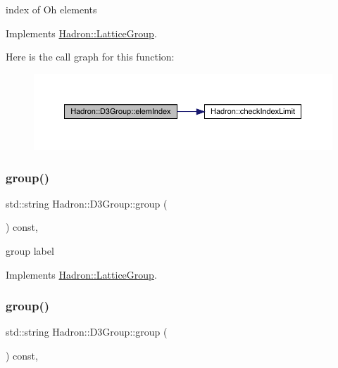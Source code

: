 index of Oh elements 

Implements \mbox{\hyperlink{structHadron_1_1LatticeGroup_afb8e3ee60de059f75bce1044c694e1e8}{Hadron\+::\+Lattice\+Group}}.

Here is the call graph for this function\+:
\nopagebreak
\begin{figure}[H]
\begin{center}
\leavevmode
\includegraphics[width=350pt]{de/de1/structHadron_1_1D3Group_a90ac88df35dd8e919637917dc22ee903_cgraph}
\end{center}
\end{figure}
\mbox{\label{structHadron_1_1D3Group_a60e24b1e2d17481b7ab94860c95ce155}} 
\subsubsection{\texorpdfstring{group()}{group()}\hspace{0.1cm}{\footnotesize\ttfamily [1/2]}}
{\footnotesize\ttfamily std\+::string Hadron\+::\+D3\+Group\+::group (\begin{DoxyParamCaption}{ }\end{DoxyParamCaption}) const\hspace{0.3cm}{\ttfamily [inline]}, {\ttfamily [virtual]}}

group label 

Implements \mbox{\hyperlink{structHadron_1_1LatticeGroup_a82208a322bf1b1db489f16af38e70087}{Hadron\+::\+Lattice\+Group}}.

\mbox{\label{structHadron_1_1D3Group_a60e24b1e2d17481b7ab94860c95ce155}} 
\subsubsection{\texorpdfstring{group()}{group()}\hspace{0.1cm}{\footnotesize\ttfamily [2/2]}}
{\footnotesize\ttfamily std\+::string Hadron\+::\+D3\+Group\+::group (\begin{DoxyParamCaption}{ }\end{DoxyParamCaption}) const\hspace{0.3cm}{\ttfamily [inline]}, {\ttfamily [virtual]}}

